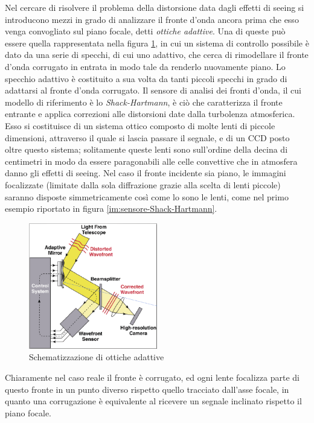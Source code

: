 Nel cercare di risolvere il problema della distorsione data dagli effetti di seeing si introducono mezzi in grado di analizzare il fronte d'onda ancora prima che esso venga convogliato sul piano focale, detti \textit{ottiche adattive}. Una di queste può essere quella rappresentata nella figura \ref{im:ottiche-adattive}, in cui un sistema di controllo possibile è dato da una serie di specchi, di cui uno adattivo, che cerca di rimodellare il fronte d'onda corrugato in entrata in modo tale da renderlo nuovamente piano. Lo specchio adattivo è costituito a sua volta da tanti piccoli specchi in grado di adattarsi al fronte d'onda corrugato. Il sensore di analisi dei fronti d'onda, il cui modello di riferimento è lo \textit{Shack-Hartmann}, è ciò che caratterizza il fronte entrante e applica correzioni alle distorsioni date dalla turbolenza atmosferica. Esso si costituisce di un sistema ottico composto di molte lenti di piccole dimensioni, attraverso il quale si lascia passare il segnale, e di un CCD posto oltre questo sistema; solitamente queste lenti sono sull'ordine della decina di centimetri in modo da essere paragonabili alle celle convettive che in atmosfera danno gli effetti di seeing. Nel caso il fronte incidente sia piano, le immagini focalizzate (limitate dalla sola diffrazione grazie alla scelta di lenti piccole) saranno disposte simmetricamente così come lo sono le lenti, come nel primo esempio riportato in figura \ref{im:sensore-Shack-Hartmann}.

\begin{figure}[h]
	\centering
	\includegraphics[width=0.5\textwidth]{Immagini/Capitolo2/ottiche_adattive.PNG}
	\caption{Schematizzazione di ottiche adattive}
	\label{im:ottiche-adattive}
\end{figure}

Chiaramente nel caso reale il fronte è corrugato, ed ogni lente focalizza parte di questo fronte in un punto diverso rispetto quello tracciato dall'asse focale, in quanto una corrugazione è equivalente al ricevere un segnale inclinato rispetto il piano focale.

